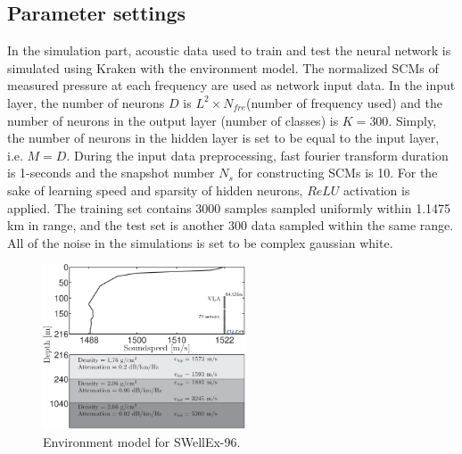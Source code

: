 \subsection{Parameter settings}
In the simulation part, acoustic data used to train and test the neural network is simulated using Kraken\cite{porter1992kraken} with the environment model. The normalized SCMs of measured pressure at each frequency are used as network input data. In the input layer, the number of neurons $D$ is $L^{2} \times N_{fre}$(number of frequency used) and the number of neurons in the output layer (number of classes) is $K = 300$. Simply, the number of neurons in the hidden layer is set to be equal to the input layer, i.e. $M = D$. During the input data preprocessing, fast fourier transform duration is 1-seconds and the snapshot number $N_{s}$ for constructing SCMs is 10.
For the sake of learning speed and sparsity of hidden neurons, $ReLU$ activation \cite{goodfellow2016deep} is applied.
The training set contains 3000 samples sampled uniformly within 1.1475 km in range, and the test set is another 300 data sampled within the same range. All of the noise in the simulations is set to be complex gaussian white.
\begin{figure}
\includegraphics[width=6cm]{figure/environment}
\caption{Environment model for SWellEx-96.}
\end{figure}
